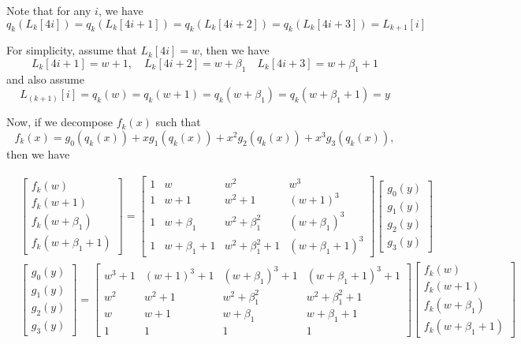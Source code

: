 \documentclass[11pt,runningheads]{llncs}
\begin{document}
Note that for any $i$, we have
\[ q_k(L_{k}[4i])=q_k(L_{k}[4i+1])=q_k(L_{k}[4i+2])=q_k(L_{k}[4i+3])=L_{k+1}[i] \]

For simplicity, assume that $L_{k}[4i]=w$, then we have
\[L_{k}[4i+1]=w+1, \quad L_{k}[4i+2]=w+\beta_1 \quad L_{k}[4i+3]=w+\beta_1+1
\]
and also assume 
\[L_{(k+1)}[i]=q_k(w)=q_k(w+1)=q_k(w+\beta_1)=q_k(w+\beta_1+1)=y  \]

Now, if we decompose $f_k(x)$ such that
\[f_{k}(x)= g_0(q_k(x))+ xg_1(q_k(x))+ x^2g_2(q_k(x))+ x^3g_3(q_k(x)), \]
then we have

\begin{equation*}
    \begin{aligned}
        &
        \begin{bmatrix}
            f_k(w)\\
            f_k(w+1)\\
            f_k(w+\beta_1)\\
            f_k(w+\beta_1+1)
        \end{bmatrix}
        =
        \begin{bmatrix}
            1 & w & w^2 & w^3 \\
            1 & w+1 & w^2+1 & (w+1)^3 \\
            1 & w+\beta_1 & w^2+\beta_1^2 & (w+\beta_1)^3 \\
            1 & w+\beta_1+1 & w^2+\beta_1^2+1 & (w+\beta_1+1)^3
        \end{bmatrix}
        \begin{bmatrix}
            g_0(y)\\
            g_1(y)\\
            g_2(y)\\
            g_3(y)
        \end{bmatrix}\\
        &
        \begin{bmatrix}
            g_0(y)\\
            g_1(y)\\
            g_2(y)\\
            g_3(y)
        \end{bmatrix}
        =
        \begin{bmatrix}
            w^3+1 & (w+1)^3+1 & (w+\beta_1)^3+1 & (w+\beta_1+1)^3+1 \\
            w^2 & w^2+1 & w^2+\beta_1^2 & w^2+\beta_1^2+1 \\
            w & w+1 & w+\beta_1 & w+\beta_1+1 \\
            1 & 1 & 1 & 1
        \end{bmatrix}
        \begin{bmatrix}
            f_k(w)\\
            f_k(w+1)\\
            f_k(w+\beta_1)\\
            f_k(w+\beta_1+1)
        \end{bmatrix}
    \end{aligned}
\end{equation*}
\end{document}
